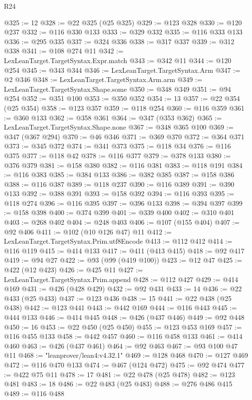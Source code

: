 \begin{lexlean}{R24}
\begin{coremodule}
@325 := 12
@328 := @22 @325 (@25 @325)
@329 := @123 @328
@330 := @120 @237
@332 := @116 @330 @133
@333 := @329 @332
@335 := @116 @333 @133
@336 := @295 @335
@337 := @324 @336
@338 := @317 @337
@339 := @312 @338
@341 := @108 @274 @11
@342 := LexLeanTarget.TargetSyntax.Expr.match
@343 := @342 @11
@344 := @120 @254
@345 := @343 @344
@346 := LexLeanTarget.TargetSyntax.Arm
@347 := @2 @346
@348 := LexLeanTarget.TargetSyntax.Arm.arm
@349 := LexLeanTarget.TargetSyntax.Shape.some
@350 := @348 @349
@351 := @94 @254
@352 := @351 @100
@353 := @350 @352
@354 := 13
@357 := @22 @354 (@25 @354)
@358 := @123 @357
@359 := @118 @254
@360 := @116 @359
@361 := @360 @133
@362 := @358 @361
@364 := @347 (@353 @362)
@365 := LexLeanTarget.TargetSyntax.Shape.none
@367 := @348 @365 @100
@369 := @347 (@367 @294)
@370 := @46 @346
@371 := @369 @370
@372 := @364 @371
@373 := @345 @372
@374 := @341 @373
@375 := @118 @34
@376 := @116 @375
@377 := @118 @42
@378 := @116 @377
@379 := @378 @133
@380 := @376 @379
@381 := @158 @380
@382 := @116 @381
@383 := @118 @191
@384 := @116 @383
@385 := @384 @133
@386 := @382 @385
@387 := @158 @386
@388 := @116 @387
@389 := @118 @237
@390 := @116 @389
@391 := @390 @133
@392 := @388 @391
@393 := @158 @392
@394 := @116 @393
@395 := @118 @274
@396 := @116 @395
@397 := @396 @133
@398 := @394 @397
@399 := @158 @398
@400 := @374 @399
@401 := @339 @400
@402 := @310 @401
@403 := @268 @402
@404 := @248 @403
@406 := @107 (@155 @404)
@407 := @92 @406
@411 := @102 (@10 @126 @47) @11
@412 := LexLeanTarget.TargetSyntax.Prim.utf8Encode
@413 := @112 @412
@414 := @116 @119
@415 := @414 @133
@417 := @411 (@413 @415)
@418 := @92 @417
@419 := @94 @27
@422 := @93 (@99 (@419 @100))
@423 := @12 @47
@425 := @422 (@12 @423)
@426 := @425 @11
@427 := LexLeanTarget.TargetSyntax.Prim.append
@428 := @112 @427
@429 := @414 @169
@431 := @426 (@428 @429)
@432 := @92 @431
@433 := 14
@436 := @22 @433 (@25 @433)
@437 := @123 @436
@438 := 15
@441 := @22 @438 (@25 @438)
@442 := @123 @441
@443 := @442 @169
@444 := @116 @443
@445 := @444 @133
@446 := @414 @445
@448 := @426 (@437 @446)
@449 := @92 @448
@450 := 16
@453 := @22 @450 (@25 @450)
@455 := @123 @453 @169
@457 := @116 @455 @133
@458 := @442 @457
@460 := @116 @458 @133
@461 := @414 @460
@463 := @426 (@437 @461)
@464 := @92 @463
@467 := @93 @100 @47 @11
@468 := "leanprover/lean4:v4.32.1"
@469 := @128 @468
@470 := @127 @469
@472 := @116 @470 @133
@474 := @467 (@124 @472)
@475 := @92 @474
@477 := @422 @75 @11
@478 := 17
@481 := @22 @478 (@25 @478)
@482 := @123 @481
@483 := 18
@486 := @22 @483 (@25 @483)
@488 := @276 @486 @415
@489 := @116 @488

\end{coremodule}
\end{lexlean}
